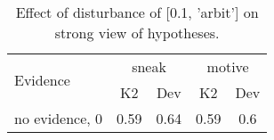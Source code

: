 \begin{table}\begin{tabular}{l|cc|cc}\toprule\multirow{2}{*}{Evidence} & \multicolumn{2}{c}{sneak}& \multicolumn{2}{c}{motive}\\& {K2} & {Dev}& {K2} & {Dev}\\\midrule
no evidence, 0 & \cellcolor{Bittersweet}0.59&\cellcolor{Bittersweet}0.64&0.59&0.6\\\bottomrule\end{tabular}\caption{Effect of disturbance of [0.1, 'arbit'] on strong view of hypotheses.}\end{table}